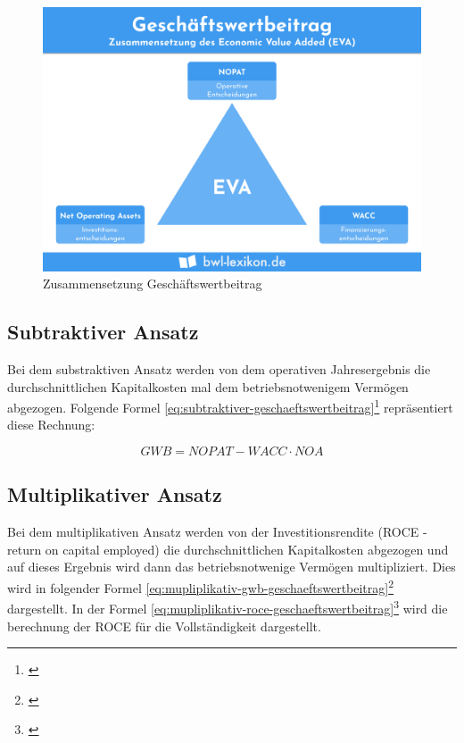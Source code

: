 \begin{figure}[!h]
    \includegraphics[width=\linewidth]{./media/economic-value-added.png}
    \caption{Zusammensetzung Geschäftswertbeitrag}
    \label{fig:zsmgeschaeftswertbeitrag}
\end{figure}

\subsection{Subtraktiver Ansatz}

Bei dem substraktiven Ansatz werden von dem operativen Jahresergebnis die durchschnittlichen Kapitalkosten mal dem betriebsnotwenigem Vermögen abgezogen. Folgende Formel \eqref{eq:subtraktiver-geschaeftswertbeitrag}\footnote{\cite{wikipedia-eva}} repräsentiert diese Rechnung:

\begin{equation}
    GWB = NOPAT - WACC \cdot NOA
    \label{eq:subtraktiver-geschaeftswertbeitrag}
\end{equation}

\subsection{Multiplikativer Ansatz}

Bei dem multiplikativen Ansatz werden von der Investitionsrendite (ROCE - return on capital employed) die durchschnittlichen Kapitalkosten abgezogen und auf dieses Ergebnis wird dann das betriebsnotwenige Vermögen multipliziert. Dies wird in folgender Formel \eqref{eq:mupliplikativ-gwb-geschaeftswertbeitrag}\footnote{\cite{wikipedia-eva}} dargestellt. In der Formel \eqref{eq:mupliplikativ-roce-geschaeftswertbeitrag}\footnote{\cite{wikipedia-eva}} wird die berechnung der ROCE für die Vollständigkeit dargestellt.

